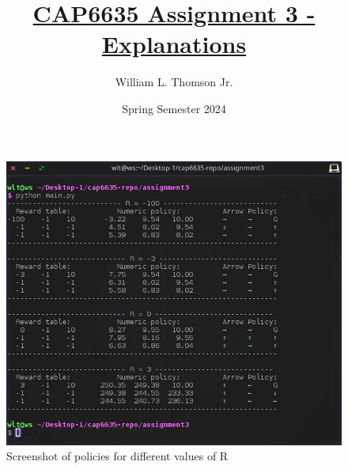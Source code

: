 \documentclass[12pt]{article}
\title{\vspace{-50pt}\textbf{\underline{CAP6635 Assignment 3 - Explanations}}}
\author{William L. Thomson Jr.}
\date{Spring Semester 2024}
\begin{document}
\maketitle

\vspace{-1.75em}

\begin{figure}[H]
\begin{center}
\includegraphics[scale=0.75]{screenshot}
\caption{Screenshot of policies for different values of R}
\label{figure1}
\end{center}
\end{figure}
\end{document}
